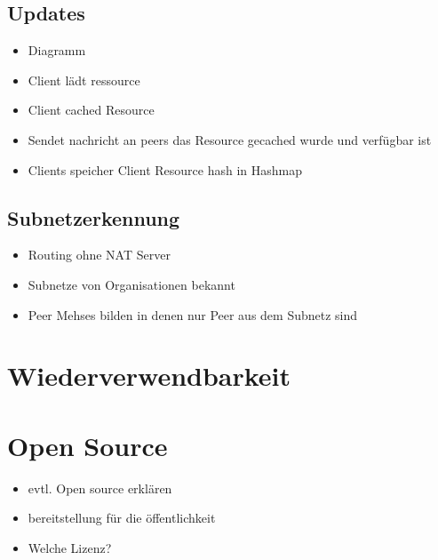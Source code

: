 \subsection{ Updates }

\begin{itemize}
	\item Diagramm
	\item Client lädt ressource 
	\item Client cached Resource
	\item Sendet nachricht an peers das Resource gecached wurde und verfügbar ist
	\item Clients speicher Client Resource hash in Hashmap

\end{itemize}
\subsection{Subnetzerkennung}
\begin{itemize}
	\item Routing ohne NAT Server
	\item Subnetze von Organisationen bekannt
	\item Peer Mehses bilden in denen nur Peer aus dem Subnetz sind
\end{itemize}

\section{Wiederverwendbarkeit}
\section{Open Source}
\begin{itemize}
	\item evtl. Open source erklären
	\item bereitstellung für die öffentlichkeit
	\item Welche Lizenz?
\end{itemize}
%

